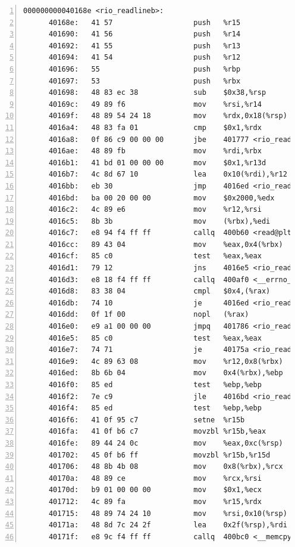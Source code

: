 \documentclass{article}
\begin{document}
\begin{lstlisting}[title = bomb的反汇编代码及部分注释, xleftmargin = 2em,xrightmargin = 2em, aboveskip = 1em, numbers = left, basicstyle=\scriptsize\ttfamily, numberstyle=\scriptsize]
    000000000040168e <rio_readlineb>:
      40168e:	41 57                	push   %r15
      401690:	41 56                	push   %r14
      401692:	41 55                	push   %r13
      401694:	41 54                	push   %r12
      401696:	55                   	push   %rbp
      401697:	53                   	push   %rbx
      401698:	48 83 ec 38          	sub    $0x38,%rsp
      40169c:	49 89 f6             	mov    %rsi,%r14
      40169f:	48 89 54 24 18       	mov    %rdx,0x18(%rsp)
      4016a4:	48 83 fa 01          	cmp    $0x1,%rdx
      4016a8:	0f 86 c9 00 00 00    	jbe    401777 <rio_readlineb+0xe9>
      4016ae:	48 89 fb             	mov    %rdi,%rbx
      4016b1:	41 bd 01 00 00 00    	mov    $0x1,%r13d
      4016b7:	4c 8d 67 10          	lea    0x10(%rdi),%r12
      4016bb:	eb 30                	jmp    4016ed <rio_readlineb+0x5f>
      4016bd:	ba 00 20 00 00       	mov    $0x2000,%edx
      4016c2:	4c 89 e6             	mov    %r12,%rsi
      4016c5:	8b 3b                	mov    (%rbx),%edi
      4016c7:	e8 94 f4 ff ff       	callq  400b60 <read@plt>
      4016cc:	89 43 04             	mov    %eax,0x4(%rbx)
      4016cf:	85 c0                	test   %eax,%eax
      4016d1:	79 12                	jns    4016e5 <rio_readlineb+0x57>
      4016d3:	e8 18 f4 ff ff       	callq  400af0 <__errno_location@plt>
      4016d8:	83 38 04             	cmpl   $0x4,(%rax)
      4016db:	74 10                	je     4016ed <rio_readlineb+0x5f>
      4016dd:	0f 1f 00             	nopl   (%rax)
      4016e0:	e9 a1 00 00 00       	jmpq   401786 <rio_readlineb+0xf8>
      4016e5:	85 c0                	test   %eax,%eax
      4016e7:	74 71                	je     40175a <rio_readlineb+0xcc>
      4016e9:	4c 89 63 08          	mov    %r12,0x8(%rbx)
      4016ed:	8b 6b 04             	mov    0x4(%rbx),%ebp
      4016f0:	85 ed                	test   %ebp,%ebp
      4016f2:	7e c9                	jle    4016bd <rio_readlineb+0x2f>
      4016f4:	85 ed                	test   %ebp,%ebp
      4016f6:	41 0f 95 c7          	setne  %r15b
      4016fa:	41 0f b6 c7          	movzbl %r15b,%eax
      4016fe:	89 44 24 0c          	mov    %eax,0xc(%rsp)
      401702:	45 0f b6 ff          	movzbl %r15b,%r15d
      401706:	48 8b 4b 08          	mov    0x8(%rbx),%rcx
      40170a:	48 89 ce             	mov    %rcx,%rsi
      40170d:	b9 01 00 00 00       	mov    $0x1,%ecx
      401712:	4c 89 fa             	mov    %r15,%rdx
      401715:	48 89 74 24 10       	mov    %rsi,0x10(%rsp)
      40171a:	48 8d 7c 24 2f       	lea    0x2f(%rsp),%rdi
      40171f:	e8 9c f4 ff ff       	callq  400bc0 <__memcpy_chk@plt>

\end{lstlisting}
\end{document}
